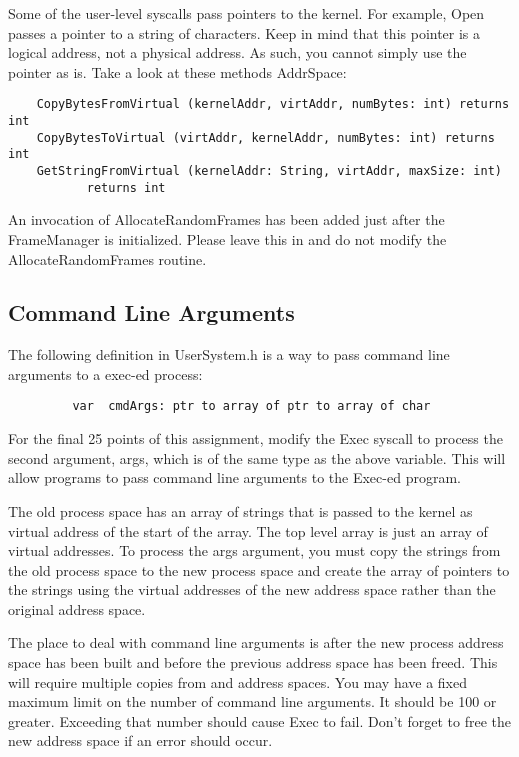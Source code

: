 \documentclass[12pt]{article}
\begin{document}
Some of the user-level syscalls pass pointers to the kernel.  For
example, Open passes a pointer to a string of characters.  Keep in
mind that this pointer is a logical address, not a physical address.
As such, you cannot simply use the pointer as is.  Take a look at
these methods AddrSpace:

\begin{verbatim}
    CopyBytesFromVirtual (kernelAddr, virtAddr, numBytes: int) returns int
    CopyBytesToVirtual (virtAddr, kernelAddr, numBytes: int) returns int
    GetStringFromVirtual (kernelAddr: String, virtAddr, maxSize: int)
           returns int
\end{verbatim}

An invocation of AllocateRandomFrames has been added just after the
FrameManager is initialized. Please leave this in and do not modify
the AllocateRandomFrames routine.

\subsection{Command Line Arguments}

The following definition in UserSystem.h is a way 
to pass command line arguments to a exec-ed process:

\begin{verbatim}
         var  cmdArgs: ptr to array of ptr to array of char
\end{verbatim}

For the final 25 points of this assignment, modify the Exec syscall to
process the second argument, args, which is of the same type as the
above variable.  This will allow programs to pass command line
arguments to the Exec-ed program. 

The old process space has an array of strings that is passed to the
kernel as virtual address of the start of the array.  The top level
array is just an array of virtual addresses.  To process the args
argument, you must copy the strings from the old process space to the
new process space and create the array of pointers to the strings
using the virtual addresses of the new address space rather than the
original address space.

The place to deal with command line arguments is after the
new process address space has been built and before the previous
address space has been freed.  This will require multiple copies from
and address spaces.  You may have a fixed maximum limit on the number
of command line arguments.  It should be 100 or greater.  Exceeding
that number should cause Exec to fail.  Don't forget to free the new
address space if an error should occur. 
\end{document}
